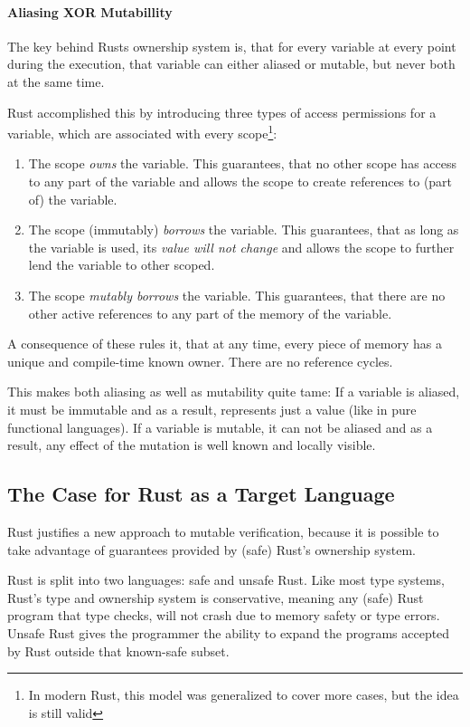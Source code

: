 \documentclass{book}
\theoremstyle{definition}
\begin{document}
\paragraph{Aliasing XOR Mutabillity} The key behind Rusts ownership system is, that for every variable at every point during the execution, that variable can either aliased or mutable, but never both at the same time.

Rust accomplished this by introducing three types of access permissions for a variable, which are associated with every scope\footnote{In modern Rust, this model was generalized to cover more cases, but the idea is still valid}:
\begin{enumerate}
  \item The scope \textit{owns} the variable. This guarantees, that no other scope has access to any part of the variable and allows the scope to create references to (part of) the variable.
  \item The scope (immutably) \textit{borrows} the variable. This guarantees, that as long as the variable is used, its \textit{value will not change} and allows the scope to further lend the variable to other scoped.
  \item The scope \textit{mutably borrows} the variable. This guarantees, that there are no other active references to any part of the memory of the variable.
\end{enumerate}

A consequence of these rules it, that at any time, every piece of memory has a unique and compile-time known owner. There are no reference cycles.

This makes both aliasing as well as mutability quite tame:
If a variable is aliased, it must be immutable and as a result, represents just a value (like in pure functional languages).
If a variable is mutable, it can not be aliased and as a result, any effect of the mutation is well known and locally visible.

\subsection{The Case for Rust as a Target Language}


Rust justifies a new approach to mutable verification, because it is possible to take advantage of guarantees provided by (safe) Rust's ownership system. 

Rust is split into two languages: safe and unsafe Rust. Like most type systems, Rust's type and ownership system is conservative, meaning any (safe) Rust program that type checks, will not crash due to memory safety or type errors. Unsafe Rust gives the programmer the ability to expand the programs accepted by Rust outside that known-safe subset.
\end{document}
